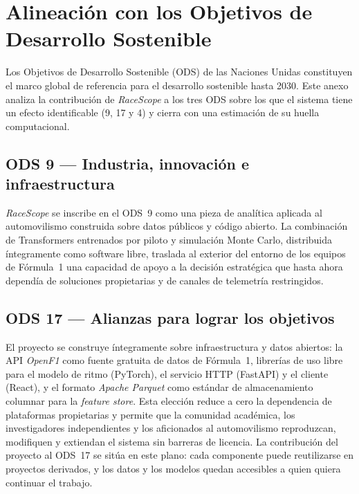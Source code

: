 
\chapter{Alineación con los Objetivos de Desarrollo Sostenible}
\label{ann:ods}

Los Objetivos de Desarrollo Sostenible (ODS) de las Naciones Unidas constituyen el marco global de referencia para el desarrollo sostenible hasta 2030. Este anexo analiza la contribución de \textit{RaceScope} a los tres ODS sobre los que el sistema tiene un efecto identificable (9, 17 y 4) y cierra con una estimación de su huella computacional.

\section*{ODS 9 — Industria, innovación e infraestructura}

\textit{RaceScope} se inscribe en el ODS~9 como una pieza de analítica aplicada al automovilismo construida sobre datos públicos y código abierto. La combinación de Transformers entrenados por piloto y simulación Monte Carlo, distribuida íntegramente como software libre, traslada al exterior del entorno de los equipos de Fórmula~1 una capacidad de apoyo a la decisión estratégica que hasta ahora dependía de soluciones propietarias y de canales de telemetría restringidos.

\section*{ODS 17 — Alianzas para lograr los objetivos}

El proyecto se construye íntegramente sobre infraestructura y datos abiertos: la API \textit{OpenF1} como fuente gratuita de datos de Fórmula~1, librerías de uso libre para el modelo de ritmo (PyTorch), el servicio HTTP (FastAPI) y el cliente (React), y el formato \textit{Apache Parquet} como estándar de almacenamiento columnar para la \textit{feature store}. Esta elección reduce a cero la dependencia de plataformas propietarias y permite que la comunidad académica, los investigadores independientes y los aficionados al automovilismo reproduzcan, modifiquen y extiendan el sistema sin barreras de licencia. La contribución del proyecto al ODS~17 se sitúa en este plano: cada componente puede reutilizarse en proyectos derivados, y los datos y los modelos quedan accesibles a quien quiera continuar el trabajo.

